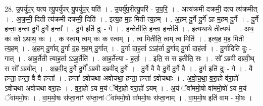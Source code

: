 \documentclass[17pt]{extarticle}
\begin{document}
28. उ॒पर्यु॑प॒र् यत्य त्यु॒पर्यु॑पर् यु॒पर्यु॑प॒र् यति॑ । . उ॒पर्यु॑प॒रीत्यु॒परि॑ - उ॒प॒रि॒ । . अत्य॑क्रमी दक्रमी॒ दत्य त्य॑क्रमीत् । . अ॒क्र॒मी॒ दिती त्य॑क्रमी दक्रमी॒ दिति॑ । . इत्य॒ह म॒ह मिती त्य॒हम् । . अ॒हम् दु॒र्गे दु॒र्गे॑ ऽह म॒हम् दु॒र्गे । . दु॒र्गे हन्ता॒ हन्ता॑ दु॒र्गे दु॒र्गे हन्ता᳚ । . दु॒र्ग इति॑ दुः - गे । . हन्तेतीति॒ हन्ता॒ हन्तेति॑ । . इत्यथाथे तीत्यथ॑ । . अथ॒ कः को ऽथाथ॒ कः । . क स्त्वम् त्वम् कः क स्त्वम् । . त्व मितीति॒ त्वम् त्व मिति॑ । . इत्य॒ह म॒ह मिती त्य॒हम् । . अ॒हम् दु॒र्गाद् दु॒र्गा द॒ह म॒हम् दु॒र्गात् । . दु॒र्गा दाह॒र्ता ऽऽह॑र्ता दु॒र्गाद् दु॒र्गा दाह॑र्ता । . दु॒र्गादिति॑ दुः - गात् । . आह॒र्तेती त्याह॒र्ता ऽऽह॒र्तेति॑ । . आह॒र्तेत्या - ह॒र्ता॒ । . इति॒ स स इतीति॒ सः । . सो᳚ ऽब्रवी दब्रवी॒थ् स सो᳚ ऽब्रवीत् । . अ॒ब्र॒वी॒द् दु॒र्गे दु॒र्गे᳚ ऽब्रवी दब्रवीद् दु॒र्गे । . दु॒र्गे वै वै दु॒र्गे दु॒र्गे वै । . दु॒र्ग इति॑ दुः - गे । . वै हन्ता॒ हन्ता॒ वै वै हन्ता᳚ । . हन्ता॑ ऽवोचथा अवोचथा॒ हन्ता॒ हन्ता॑ ऽवोचथाः । . अ॒वो॒च॒था॒ व॒रा॒हो व॑रा॒हो॑ ऽवोचथा अवोचथा वरा॒हः । . व॒रा॒हो॑ ऽय म॒यं ॅव॑रा॒हो व॑रा॒हो॑ ऽयम् । . अ॒यं ॅवा॑ममो॒षो वा॑ममो॒षो॑ ऽय म॒यं ॅवा॑ममो॒षः । . वा॒म॒मो॒षः स॑प्ता॒नाꣳ स॑प्ता॒नां ॅवा॑ममो॒षो वा॑ममो॒षः स॑प्ता॒नाम् । . वा॒म॒मो॒ष इति॑ वाम - मो॒षः । \newline
\end{document}

